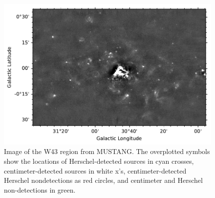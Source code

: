 \documentclass[twocolumn]{aastex62}
\begin{document}
\begin{figure}[htp]
    \includegraphics[width=17cm]{figures/W43_catalog_overlay.pdf}
\caption{Image of the W43 region from MUSTANG.  The overplotted symbols show the locations
of Herschel-detected sources in cyan crosses, centimeter-detected sources in white x's, centimeter-detected Herschel nondetections as red circles,
and centimeter and Herschel non-detections in green.}
\label{fig:w43overview}
\end{figure}


\end{document}
